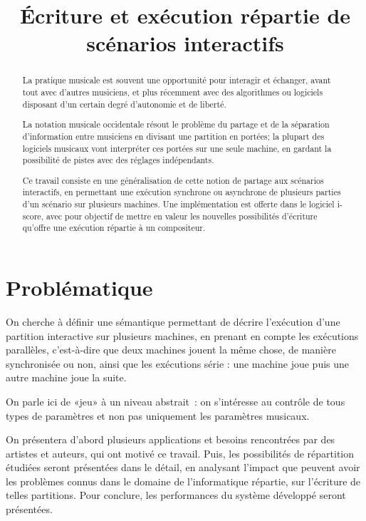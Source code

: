 \documentclass{article}
\title{Écriture et exécution répartie de scénarios interactifs}
\begin{document}
\maketitle
\begin{abstract}
    La pratique musicale est souvent une opportunité pour interagir et échanger, 
    avant tout avec d'autres musiciens, et plus récemment avec des algorithmes ou logiciels 
    disposant d'un certain degré d'autonomie et de liberté.
    
    La notation musicale occidentale résout le problème du partage et de la séparation d'information entre musiciens 
    en divisant une partition en portées; la plupart des logiciels musicaux vont interpréter ces portées sur une seule machine, en gardant la possibilité de pistes avec des réglages indépendants. 
    
    Ce travail consiste en une généralisation de cette notion de partage aux scénarios interactifs, en permettant une exécution synchrone ou asynchrone de plusieurs parties d'un scénario sur plusieurs machines.
    Une implémentation est offerte dans le logiciel i-score, avec pour objectif de mettre en valeur 
    les nouvelles possibilités d'écriture qu'offre une exécution répartie à un compositeur.
\end{abstract}
\section{Problématique}
On cherche à définir une sémantique permettant de décrire l'exécution d'une partition interactive sur plusieurs machines, en prenant en compte les exécutions parallèles, c'est-à-dire que deux machines jouent la même chose, de manière synchronisée ou non, ainsi que les exécutions série : une machine joue puis une autre machine joue la suite.

On parle ici de «jeu» à un niveau abstrait~: on s'intéresse au contrôle de tous types de paramètres et non pas uniquement les paramètres musicaux.

On présentera d'abord plusieurs applications et besoins rencontrées par des artistes et auteurs, qui ont motivé ce travail.
Puis, les possibilités de répartition étudiées seront présentées dans le détail, en analysant l'impact que peuvent avoir les problèmes connus dans le domaine de l'informatique répartie, sur l'écriture de telles partitions. 
Pour conclure, les performances du système développé seront présentées.

\end{document}
